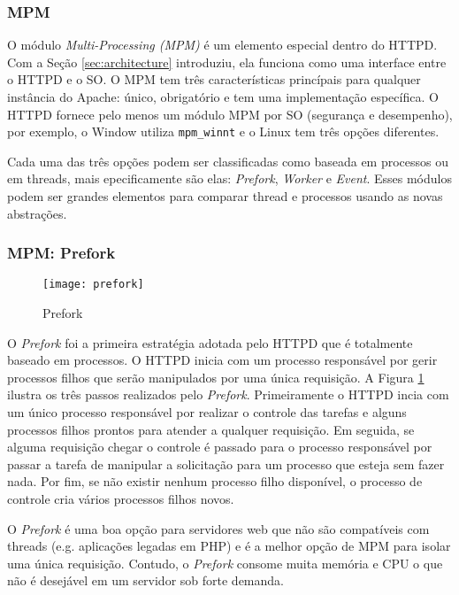 \subsubsection{MPM}

O módulo \textit{Multi-Processing (MPM)} é um elemento especial dentro do HTTPD. Com a Seção \ref{sec:architecture} introduziu, ela funciona como uma interface entre o HTTPD e o SO. O MPM tem três características princípais para qualquer instância do Apache: único, obrigatório e tem uma implementação específica. O HTTPD fornece pelo menos um módulo MPM por SO (segurança e desempenho), por exemplo, o Window utiliza \texttt{mpm\_winnt} e o Linux tem três opções diferentes.

Cada uma das três opções podem ser classificadas como baseada em processos ou em threads, mais epecificamente são elas: \textit{Prefork}, \textit{Worker} e \textit{Event}. Esses módulos podem ser grandes elementos para comparar thread e processos usando as novas abstrações.

\subsubsection{MPM: Prefork}
\label{sec:prefork}

\begin{figure}[!h]
  \centering
  \texttt{[image: prefork]} 
  \caption{Prefork}
  \label{fig:prefork} 
\end{figure}

O \textit{Prefork} foi a primeira estratégia adotada pelo HTTPD que é totalmente baseado em processos. O HTTPD inicia com um processo responsável por gerir processos filhos que serão manipulados por uma única requisição. A Figura \ref{fig:prefork} ilustra os três passos realizados pelo \textit{Prefork}. Primeiramente o HTTPD incia com um único processo responsável por realizar o controle das tarefas e alguns processos filhos prontos para atender a qualquer requisição. Em seguida, se alguma requisição chegar o controle é passado para o processo responsável por passar a tarefa de manipular a solicitação para um processo que esteja sem fazer nada. Por fim, se não existir nenhum processo filho disponível, o processo de controle cria vários processos filhos novos.

O \textit{Prefork} é uma boa opção para servidores web que não são compatíveis com threads (e.g. aplicações legadas em PHP) e é a melhor opção de MPM para isolar uma única requisição. Contudo, o \textit{Prefork} consome muita memória e CPU o que não é desejável em um servidor sob forte demanda.


